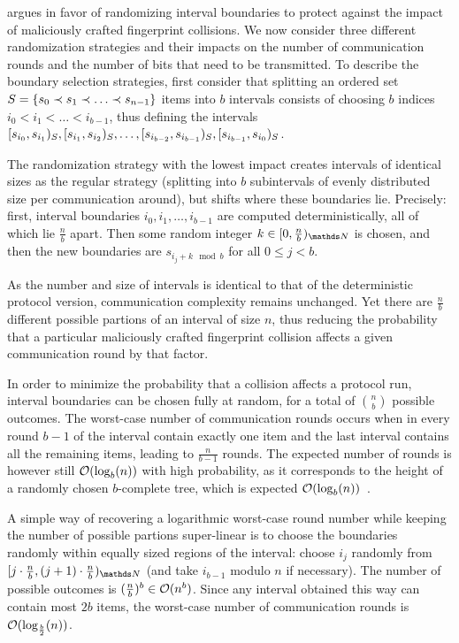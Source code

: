  argues in favor of randomizing interval boundaries to protect against the impact of maliciously crafted fingerprint collisions. We now consider three different randomization strategies and their impacts on the number of communication rounds and the number of bits that need to be transmitted. To describe the boundary selection strategies, first consider that splitting an ordered set $S = \{s_0 \prec s_1 \prec \ldots \prec s_{n - 1}\}$ items into $b$ intervals consists of choosing $b$ indices $i_0 < i_1 < \ldots < i_{b-1}$, thus defining the intervals $[{s_{i_0}},{s_{i_1}})_{S}, [{s_{i_1}},{s_{i_2}})_{S}, \ldots, [{s_{i_{b - 2}}},{s_{i_{b - 1}}})_{S}, [{s_{i_{b - 1}}},{s_{i_0}})_{S}$.

The randomization strategy with the lowest impact creates intervals of identical sizes as the regular strategy (splitting into $b$ subintervals of evenly distributed size per communication around), but shifts where these boundaries lie. Precisely: first, interval boundaries $i_0, i_1, \ldots, i_{b - 1}$ are computed deterministically, all of which lie $\frac{n}{b}$ apart. Then some random integer $k \in \interval{0}{\frac{n}{b}}{\N}$ is chosen, and then the new boundaries are $s_{i_j + k \mod b}$ for all $0 \leq j < b$.

 As the number and size of intervals is identical to that of the deterministic protocol version, communication complexity remains unchanged. Yet there are $\frac{n}{b}$ different possible partions of an interval of size $n$, thus reducing the probability that a particular maliciously crafted fingerprint collision affects a given communication round by that factor.

In order to minimize the probability that a collision affects a protocol run, interval boundaries can be chosen fully at random, for a total of $\binom{n}{b}$ possible outcomes. The worst-case number of communication rounds occurs when in every round $b-1$ of the interval contain exactly one item and the last interval contains all the remaining items, leading to $\frac{n}{b - 1}$ rounds. The expected number of rounds is however still $\mathcal{O}(\log_b(n))$ with high probability, as it corresponds to the height of a randomly chosen $b$-complete tree, which is expected $\mathcal{O}(\log_b(n))$~\cite{devroye1990height}.

A simple way of recovering a logarithmic worst-case round number while keeping the number of possible partions super-linear is to choose the boundaries randomly within equally sized regions of the interval: choose $i_j$ randomly from $\interval{j \cdot \frac{n}{b}}{(j + 1) \cdot \frac{n}{b}}{\N}$ (and take $i_{b - 1}$ modulo $n$ if necessary). The number of possible outcomes is $(\frac{n}{b})^b \in \mathcal{O}(n^b)$. Since any interval obtained this way can contain most $2b$ items, the worst-case number of communication rounds is $\mathcal{O}(\log_{\frac{b}{2}}(n))$.


